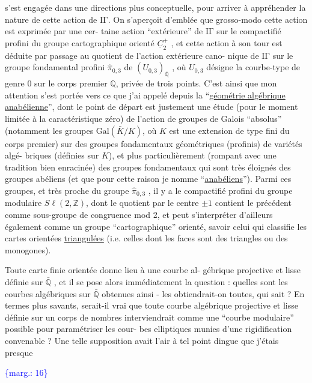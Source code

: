 \documentclass[11pt]{article}
\newcommand{\scanpage}[1]{\par\bigskip\noindent{\small\sffamily[scan #1]}\par}
\newcommand{\mspage}[1]{{\small\sffamily[p.\,#1]}}
\newcommand{\margin}[1]{\textcolor{blue}{\{\textsf{marg.:} #1\}}}
\newcommand{\uline}[1]{\underline{#1}}
\begin{document}
s'est engagée dans une directions plus conceptuelle, pour arriver
à appréhender la nature de cette action de $\mathrm{I\!\Gamma}$. On s'aperçoit
d'emblée que grosso-modo cette action est exprimée par une cer-%
taine action ``extérieure'' de $\mathrm{I\!\Gamma}$ sur le compactifié profini du
groupe cartographique orienté $\underline{C}_2^{+}$ , et cette action à son tour
est déduite par passage au quotient de l'action extérieure cano-%
nique de $\mathrm{I\!\Gamma}$ sur le groupe fondamental profini $\hat{\pi}_{0,3}$ de $(U_{0,3})_{\bar{\mathbb{Q}}}$ ,
où $U_{0,3}$ désigne la courbe-type de genre $0$ sur le corps premier
$\mathbb{Q}$, privée de trois points. C'est ainsi que mon attention s'est
portée vers ce que j'ai appelé depuis la ``\uline{géométrie algébrique}
\uline{anabélienne}'', dont le point de départ est justement une étude
(pour le moment limitée à la caractéristique zéro) de l'action
de groupes de Galois ``absolus'' (notamment les groupes $\mathrm{Gal}(\bar{K}/K)$,
où $K$ est une extension de type fini du corps premier) sur des
groupes fondamentaux géométriques (profinis) de variétés algé-%
briques (définies sur $K$), et plus particulièrement (rompant avec
une tradition bien enracinée) des groupes fondamentaux qui sont
très éloignés des groupes abéliens (et que pour cette raison je
nomme ``\uline{anabéliens}''). Parmi ces groupes, et très proche du groupe
$\hat{\pi}_{0,3}$ , il y a le compactifié profini du groupe modulaire $S\ell(2,\mathbb{Z})$,
dont le quotient par le centre $\pm 1$ contient le précédent comme
sous-groupe de congruence mod 2, et peut s'interpréter d'ailleurs
également comme un groupe ``cartographique'' orienté, savoir celui
qui classifie les cartes orientées \uline{triangulées} (i.e. celles dont
les faces sont des triangles ou des monogones).

Toute carte finie orientée donne lieu à une courbe al-%
gébrique projective et lisse définie sur $\bar{\mathbb{Q}}$ , et il se pose alors
immédiatement la question : quelles sont les courbes algébriques
sur $\bar{\mathbb{Q}}$ obtenues ainsi - les obtiendrait-on toutes, qui sait ?
En termes plus savants, serait-il vrai que toute courbe algébrique
projective et lisse définie sur un corps de nombres interviendrait
comme une ``courbe modulaire'' possible pour paramétriser les cour-%
bes elliptiques munies d'une rigidification convenable ? Une telle
supposition avait l'air à tel point dingue que j'étais presque

\margin{16}

\clearpage
\scanpage{119/17}
\mspage{15}
\end{document}
